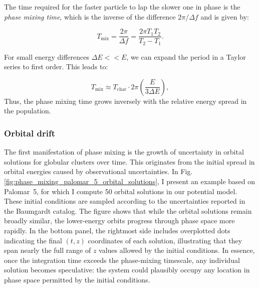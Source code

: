         The time required for the faster particle to lap the slower one in phase is the \textit{phase mixing time}, which is the inverse of the difference $2\pi / \Delta f$ and is given by:

        \begin{equation}
        T_\mathrm{mix} = \frac{2\pi}{\Delta f} = \frac{2\pi T_1 T_2}{T_2 - T_1}.
        \end{equation}

        For small energy differences \( \Delta E << E \), we can expand the period in a Taylor series to first order. This leads to:

        \begin{equation}
            T_\mathrm{mix} \approx T_\mathrm{char} \cdot 2\pi \left( \frac{E}{3 \Delta E} \right),
            \label{EQ:phase_mixing}
        \end{equation}
        Thus, the phase mixing time grows inversely with the relative energy spread in the population.

        \subsubsection{Orbital drift}
            The first manifestation of phase mixing is the growth of uncertainty in orbital solutions for globular clusters over time. This originates from the initial spread in orbital energies caused by observational uncertainties. In Fig.\ref{fig:phase_mixing_palomar_5_orbital_solutions}, I present an example based on Palomar~5, for which I compute 50 orbital solutions in our potential model. These initial conditions are sampled according to the uncertainties reported in the Baumgardt catalog. The figure shows that while the orbital solutions remain broadly similar, the lower-energy orbits progress through phase space more rapidly. In the bottom panel, the rightmost side includes overplotted dots indicating the final $(t, z)$ coordinates of each solution, illustrating that they span nearly the full range of $z$ values allowed by the initial conditions. In essence, once the integration time exceeds the phase-mixing timescale, any individual solution becomes speculative: the system could plausibly occupy any location in phase space permitted by the initial conditions.


